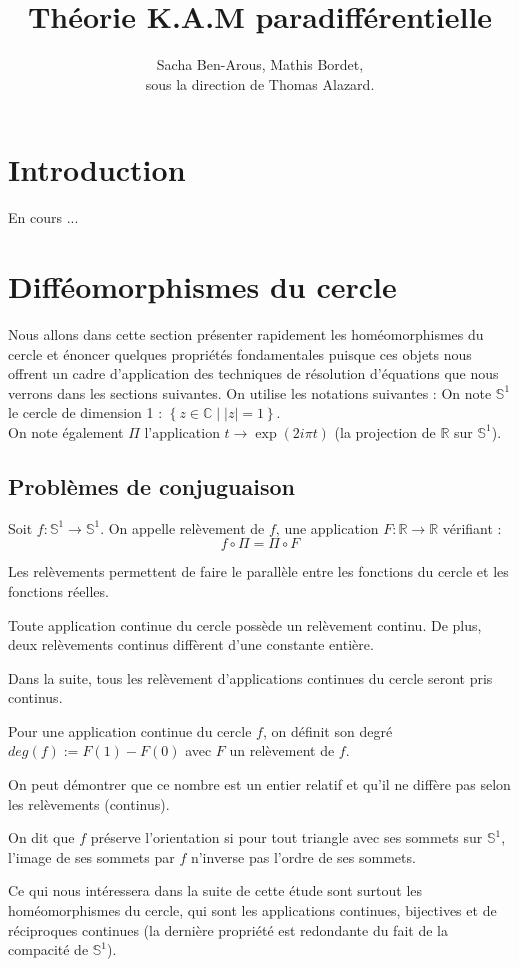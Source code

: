 \documentclass[11pt,a4paper]{article}
\title{\textbf{Théorie K.A.M paradifférentielle}}
\date{}
\author{Sacha Ben-Arous, Mathis Bordet, \\ sous la direction de Thomas Alazard.}
\begin{document}
\maketitle
\tableofcontents
\newpage

\section{Introduction}
En cours ...

\section{Difféomorphismes du cercle}
Nous allons dans cette section présenter rapidement les homéomorphismes du cercle et énoncer quelques propriétés fondamentales puisque ces objets nous offrent un cadre d'application des techniques de résolution d'équations que nous verrons dans les sections suivantes. On utilise les notations suivantes :
On note $\mathbb{S}^1$ le cercle de dimension 1 : $\left\{ z \in \mathbb{C} \mid |z|=1 \right\}$.
\\
On note également $\Pi$ l'application $ t \to \exp (2i\pi t) $ (la projection de $\mathbb{R}$ sur $\mathbb{S}^1$).
\subsection{Problèmes de conjuguaison}
\begin{defin}
Soit $f :\mathbb{S}^1 \to \mathbb{S}^1$. On appelle relèvement de $f$, une application $F :  \mathbb{R} \to \mathbb{R}$ vérifiant :
\begin{equation*}
f \circ \Pi = \Pi \circ F
\end{equation*}
\end{defin}
\begin{rmq}
Les relèvements permettent de faire le parallèle entre les fonctions du cercle et les fonctions réelles.
\end{rmq}
\begin{thm}
Toute application continue du cercle possède un relèvement continu. De plus, deux relèvements continus diffèrent d'une constante entière.
\end{thm}
Dans la suite, tous les relèvement d'applications continues du cercle seront pris continus.
\begin{defin}
Pour une application continue du cercle $f$, on définit son degré $deg(f) := F(1)-F(0)$ avec $F$ un relèvement de $f$.
\end{defin}
\begin{rmq}
On peut démontrer que ce nombre est un entier relatif et qu'il ne diffère pas selon les relèvements (continus).
\end{rmq}
\begin{defin}
On dit que $f$ préserve l'orientation si pour tout triangle avec ses sommets sur $\mathbb{S}^1$, l'image de ses sommets par $f$ n'inverse pas l'ordre de ses sommets.
\end{defin}
Ce qui nous intéressera dans la suite de cette étude sont surtout les homéomorphismes du cercle, qui sont les applications continues, bijectives et de réciproques continues (la dernière propriété est redondante du fait de la compacité de $\mathbb{S}^1$).
\end{document}
